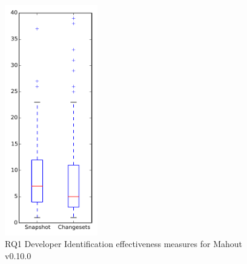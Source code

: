 
\begin{figure}[t]
\centering
\includegraphics[width=0.36\textwidth]{figures/dit/rq1_mahout}
\caption{RQ1 Developer Identification effectiveness measures for Mahout v0.10.0}
\label{fig:dit:rq1:mahout}
\end{figure}
